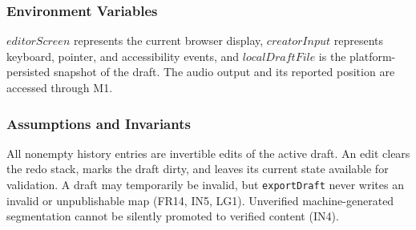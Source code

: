 \documentclass[12pt, titlepage]{article}
\begin{document}
\subsubsection{Environment Variables}
$editorScreen$ represents the current browser display,
$creatorInput$ represents keyboard, pointer, and accessibility
events, and $localDraftFile$ is the platform-persisted
snapshot of the draft. The audio output and its reported position
are accessed through M1.

\subsubsection{Assumptions and Invariants}
All nonempty history entries are invertible edits of the active
draft. An edit clears the redo stack, marks the draft dirty,
and leaves its current state available for validation. A draft
may temporarily be invalid, but \texttt{exportDraft} never
writes an invalid or unpublishable map (FR14, IN5, LG1).
Unverified machine-generated segmentation cannot be silently
promoted to verified content (IN4).
\end{document}
